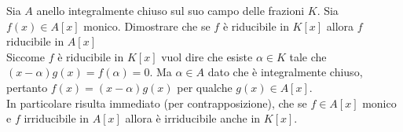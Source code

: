 \begin{esercizio}

	Sia $A$ anello integralmente chiuso sul suo campo delle frazioni $K$. Sia $f(x) \in A[x]$ monico. 
	Dimostrare che se $f$ è riducibile in $K[x]$ allora $f$ riducibile in $A[x]$\\
	
	Siccome $f$ è riducibile in $K[x]$ vuol dire che esiste $\alpha \in K$ tale che $(x-\alpha)g(x) = f(\alpha) = 0$. Ma $\alpha \in A$ 
	dato che è integralmente chiuso, pertanto $f(x) = (x-\alpha)g(x)$ per qualche $g(x) \in A[x]$.\\ 
	
	In particolare risulta immediato (per contrapposizione), 
	che se $f \in A[x]$ monico e $f$ irriducibile in $A[x]$
	allora è irriducibile anche in $K[x]$. 
\end{esercizio}

